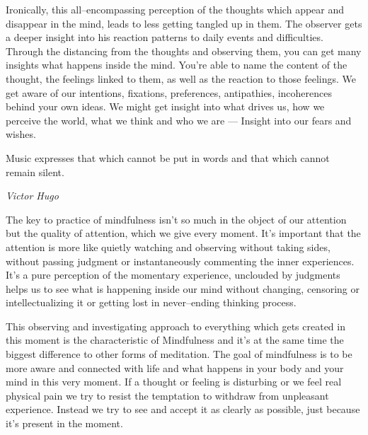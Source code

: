\documentclass[../Book.Stress_regulation.tex]{subfiles}
\begin{document}
Ironically, this all--encompassing perception of the thoughts which appear and disappear in the mind, leads to {less getting tangled up} in them.
The observer gets a {deeper insight} into his reaction patterns
to daily events and difficulties.
Through the distancing from the thoughts and observing them, you can get many insights what happens {inside the mind}.
You're able to {name the content} of the thought, the feelings linked to them,
as well as the reaction to those feelings.
We get aware of our intentions, fixations, preferences,
antipathies, incoherences behind your own ideas.
We might get insight into what drives us, how we perceive the world,
what we think and who we are ---
Insight into our fears and wishes.

\epigraph{Music expresses that which cannot be put in words and that which cannot remain silent.}{\textit{Victor Hugo}}


{The key to practice of mindfulness} isn't so much in the object of our attention but the {quality of attention}, which we give every moment.
It's important that the attention is more like {quietly watching} and observing without taking sides, without passing judgment or instantaneously commenting the inner experiences.
It's a {pure perception}  of the momentary experience, unclouded by judgments helps us to see what is happening inside our mind {without changing}, censoring or intellectualizing it
or getting lost in never--ending thinking process.


This {observing and investigating} approach to everything which gets created in this moment is the characteristic of Mindfulness and it's at the same time the biggest difference to other forms of meditation.
The goal of mindfulness is to {be more aware and connected} with life and what happens in your body and your mind in this very moment.
If a thought or feeling is disturbing or we feel real physical {pain} we try to resist the temptation to withdraw from unpleasant experience.
Instead we try to see and accept it as clearly as possible, just because it's {present in the moment}.
\end{document}
